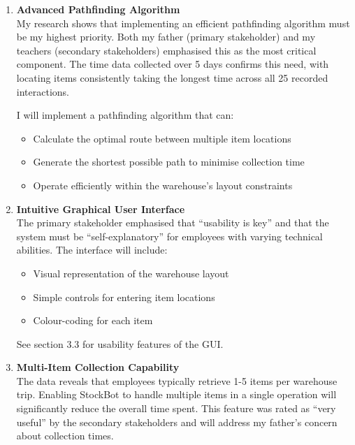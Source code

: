 \begin{enumerate}
    \item \textbf{Advanced Pathfinding Algorithm}\\
    My research shows that implementing an efficient pathfinding algorithm must be my highest priority. Both my father (primary stakeholder) and my teachers (secondary stakeholders) emphasised this as the most critical component. The time data collected over 5 days confirms this need, with locating items consistently taking the longest time across all 25 recorded interactions.
    
    I will implement a pathfinding algorithm that can:
    \begin{itemize}
        \item Calculate the optimal route between multiple item locations
        \item Generate the shortest possible path to minimise collection time
        \item Operate efficiently within the warehouse's layout constraints
    \end{itemize}
    
    \item \textbf{Intuitive Graphical User Interface}\\
    The primary stakeholder emphasised that ``usability is key'' and that the system must be ``self-explanatory'' for employees with varying technical abilities. The interface will include:
    \begin{itemize}
        \item Visual representation of the warehouse layout
        \item Simple controls for entering item locations
        \item Colour-coding for each item
    \end{itemize}

    See section 3.3 for usability features of the GUI.
    
    \item \textbf{Multi-Item Collection Capability}\\
    The data reveals that employees typically retrieve 1-5 items per warehouse trip. Enabling StockBot to handle multiple items in a single operation will significantly reduce the overall time spent. This feature was rated as ``very useful'' by the secondary stakeholders and will address my father's concern about collection times.
\end{enumerate}


